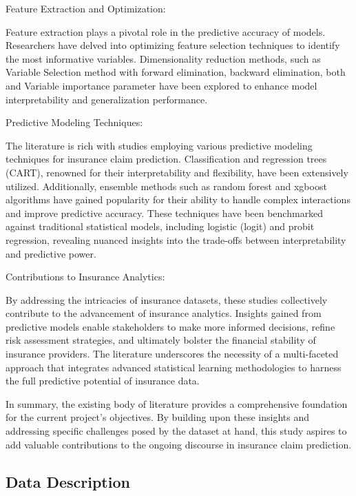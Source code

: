 \documentclass[
]{article}
\begin{document}
Feature Extraction and Optimization:

Feature extraction plays a pivotal role in the predictive accuracy of
models. Researchers have delved into optimizing feature selection
techniques to identify the most informative variables. Dimensionality
reduction methods, such as Variable Selection method with forward
elimination, backward elimination, both and Variable importance
parameter have been explored to enhance model interpretability and
generalization performance.

Predictive Modeling Techniques:

The literature is rich with studies employing various predictive
modeling techniques for insurance claim prediction. Classification and
regression trees (CART), renowned for their interpretability and
flexibility, have been extensively utilized. Additionally, ensemble
methods such as random forest and xgboost algorithms have gained
popularity for their ability to handle complex interactions and improve
predictive accuracy. These techniques have been benchmarked against
traditional statistical models, including logistic (logit) and probit
regression, revealing nuanced insights into the trade-offs between
interpretability and predictive power.

Contributions to Insurance Analytics:

By addressing the intricacies of insurance datasets, these studies
collectively contribute to the advancement of insurance analytics.
Insights gained from predictive models enable stakeholders to make more
informed decisions, refine risk assessment strategies, and ultimately
bolster the financial stability of insurance providers. The literature
underscores the necessity of a multi-faceted approach that integrates
advanced statistical learning methodologies to harness the full
predictive potential of insurance data.

In summary, the existing body of literature provides a comprehensive
foundation for the current project's objectives. By building upon these
insights and addressing specific challenges posed by the dataset at
hand, this study aspires to add valuable contributions to the ongoing
discourse in insurance claim prediction.

\newpage

\hypertarget{data-description}{%
\subsection{Data Description}\label{data-description}}
\end{document}

